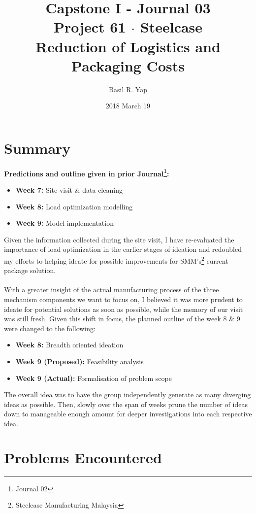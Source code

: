 \documentclass[a4paper, fleqn]{article}
\begin{document}
\title{Capstone I - Journal 03 \\ Project 61 $\cdot$  Steelcase \\ Reduction of Logistics and Packaging Costs}
\author{Basil R. Yap}
\date{2018 March 19}
\maketitle

\section{Summary}

\textbf{Predictions and outline given in prior Journal\footnote{Journal 02}:}\begin{itemize}
\item \textbf{Week 7:} Site visit \& data cleaning
\item \textbf{Week 8:} Load optimization modelling
\item \textbf{Week 9:} Model implementation
\end{itemize}
Given the information collected during the site visit, I have re-evaluated the importance of load optimization in the earlier stages of ideation and redoubled my efforts to helping ideate for possible improvements for SMM's\footnote{Steelcase Manufacturing Malaysia} current package solution.\\
\vspace{1pt}\\
With a greater insight of the actual manufacturing process of the three mechanism components we want to focus on, I believed it was more prudent to ideate for potential solutions as soon as possible, while the memory of our visit was still fresh. Given this shift in focus, the planned outline of the week 8 \& 9 were changed to the following:\begin{itemize}
\item \textbf{Week 8:} Breadth oriented ideation
\item \textbf{Week 9 (Proposed):} Feasibility analysis
\item \textbf{Week 9 (Actual):} Formalisation of problem scope
\end{itemize}
The overall idea was to have the group independently generate as many diverging ideas as possible. Then, slowly over the span of weeks prune the number of ideas down to manageable enough amount for deeper investigations into each respective idea.\\
\pagebreak
\section{Problems Encountered}
\end{document}
